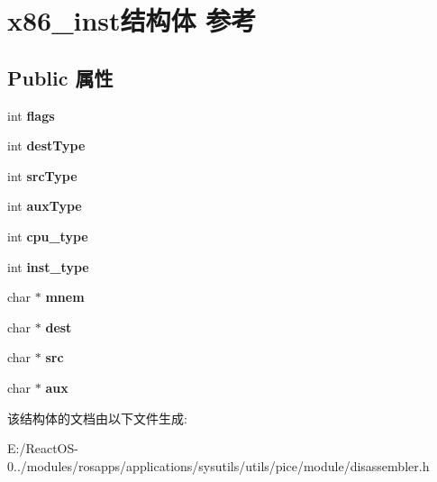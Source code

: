 \hypertarget{structx86__inst}{}\section{x86\+\_\+inst结构体 参考}
\label{structx86__inst}
\subsection*{Public 属性}
\begin{DoxyCompactItemize}
\item 
\mbox{\label{structx86__inst_aecf841e1838d71b7a540450d21512917}} 
int {\bfseries flags}
\item 
\mbox{\label{structx86__inst_a3b23987ee437d87f9588937065972395}} 
int {\bfseries dest\+Type}
\item 
\mbox{\label{structx86__inst_a1c7a04d80d34ea7e1b5a02f1a314622c}} 
int {\bfseries src\+Type}
\item 
\mbox{\label{structx86__inst_a85cb3894d26af78432906c18a9f80b0f}} 
int {\bfseries aux\+Type}
\item 
\mbox{\label{structx86__inst_a19fd286ec8451f87442e53172ebe4858}} 
int {\bfseries cpu\+\_\+type}
\item 
\mbox{\label{structx86__inst_aa9450255894d8df6cf6eea72497d1446}} 
int {\bfseries inst\+\_\+type}
\item 
\mbox{\label{structx86__inst_a15479069fcf232e63e26bba41c183677}} 
char $\ast$ {\bfseries mnem}
\item 
\mbox{\label{structx86__inst_ae731c0814b9ecceef3b14e6fee3c8569}} 
char $\ast$ {\bfseries dest}
\item 
\mbox{\label{structx86__inst_ac6710f5b73c7d01ee26fe7c30d5c3d5d}} 
char $\ast$ {\bfseries src}
\item 
\mbox{\label{structx86__inst_aff91a871098f9f8125c2dad9ef7fe0a1}} 
char $\ast$ {\bfseries aux}
\end{DoxyCompactItemize}


该结构体的文档由以下文件生成\+:\begin{DoxyCompactItemize}
\item 
E\+:/\+React\+O\+S-\/0../modules/rosapps/applications/sysutils/utils/pice/module/disassembler.\+h\end{DoxyCompactItemize}
